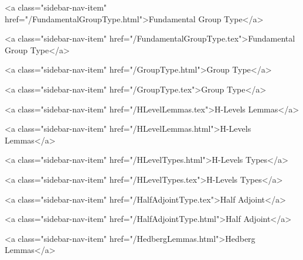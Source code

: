       
        
          <a class="sidebar-nav-item" href="/FundamentalGroupType.html">Fundamental Group Type</a>
        
      
    
      
        
          <a class="sidebar-nav-item" href="/FundamentalGroupType.tex">Fundamental Group Type</a>
        
      
    
      
        
          <a class="sidebar-nav-item" href="/GroupType.html">Group Type</a>
        
      
    
      
        
          <a class="sidebar-nav-item" href="/GroupType.tex">Group Type</a>
        
      
    
      
        
          <a class="sidebar-nav-item" href="/HLevelLemmas.tex">H-Levels Lemmas</a>
        
      
    
      
        
          <a class="sidebar-nav-item" href="/HLevelLemmas.html">H-Levels Lemmas</a>
        
      
    
      
        
          <a class="sidebar-nav-item" href="/HLevelTypes.html">H-Levels Types</a>
        
      
    
      
        
          <a class="sidebar-nav-item" href="/HLevelTypes.tex">H-Levels Types</a>
        
      
    
      
        
          <a class="sidebar-nav-item" href="/HalfAdjointType.tex">Half Adjoint</a>
        
      
    
      
        
          <a class="sidebar-nav-item" href="/HalfAdjointType.html">Half Adjoint</a>
        
      
    
      
        
          <a class="sidebar-nav-item" href="/HedbergLemmas.html">Hedberg Lemmas</a>
        
